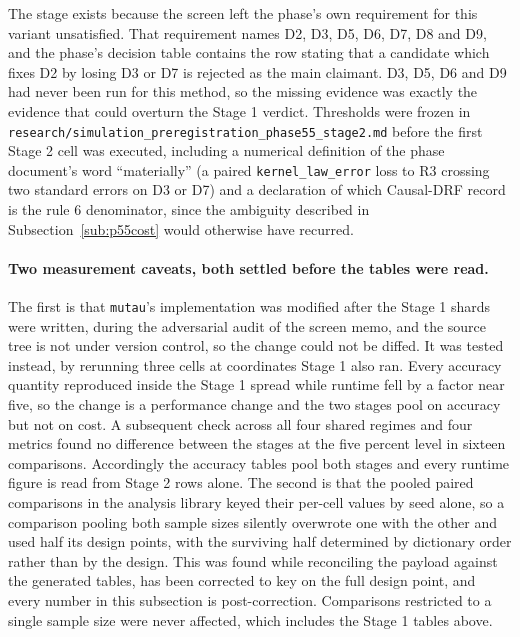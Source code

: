 The stage exists because the screen left the phase's own requirement for this
variant unsatisfied. That requirement names D2, D3, D5, D6, D7, D8 and D9, and
the phase's decision table contains the row stating that a candidate which fixes
D2 by losing D3 or D7 is rejected as the main claimant. D3, D5, D6 and D9 had
never been run for this method, so the missing evidence was exactly the evidence
that could overturn the Stage 1 verdict. Thresholds were frozen in
\texttt{research/simulation\_preregistration\_phase55\_stage2.md} before the
first Stage 2 cell was executed, including a numerical definition of the phase
document's word ``materially'' (a paired \texttt{kernel\_law\_error} loss to R3
crossing two standard errors on D3 or D7) and a declaration of which Causal-DRF
record is the rule 6 denominator, since the ambiguity described in
Subsection~\ref{sub:p55cost} would otherwise have recurred.

\paragraph{Two measurement caveats, both settled before the tables were read.}
The first is that \texttt{mutau}'s implementation was modified after the Stage 1
shards were written, during the adversarial audit of the screen memo, and the
source tree is not under version control, so the change could not be diffed. It
was tested instead, by rerunning three cells at coordinates Stage 1 also ran.
Every accuracy quantity reproduced inside the Stage 1 spread while runtime fell
by a factor near five, so the change is a performance change and the two stages
pool on accuracy but not on cost. A subsequent check across all four shared
regimes and four metrics found no difference between the stages at the five
percent level in sixteen comparisons. Accordingly the accuracy tables pool both
stages and every runtime figure is read from Stage 2 rows alone. The second is
that the pooled paired comparisons in the analysis library keyed their per-cell
values by seed alone, so a comparison pooling both sample sizes silently
overwrote one with the other and used half its design points, with the surviving
half determined by dictionary order rather than by the design. This was found
while reconciling the payload against the generated tables, has been corrected
to key on the full design point, and every number in this subsection is
post-correction. Comparisons restricted to a single sample size were never
affected, which includes the Stage 1 tables above.

